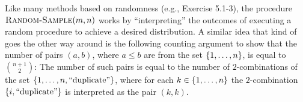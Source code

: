 \begin{enumerate}[\thesection-1]
\begin{remark}
Like many methods based on randomness (e.g., Exercise 5.1-3), the procedure $\textnormal{\scshape Random-Sample}(m, n)$ works by ``interpreting'' the outcomes of executing a random procedure to achieve a desired distribution. A similar idea that kind of goes the other way around is the following counting argument to show that the number of pairs $(a, b)$, where $a \leq b$ are from the set $\left\{1, \ldots, n\right\}$, is equal to ${n + 1 \choose 2}$: The number of such pairs is equal to the number of $2$-combinations of the set $\left\{1, \ldots, n, \mbox{``duplicate''}\right\}$, where for each $k \in \left\{1, \ldots, n\right\}$ the $2$-combination $\left\{i, \mbox{``duplicate''}\right\}$ is interpreted as the pair $(k, k)$.
\end{remark}
%
\end{enumerate}

